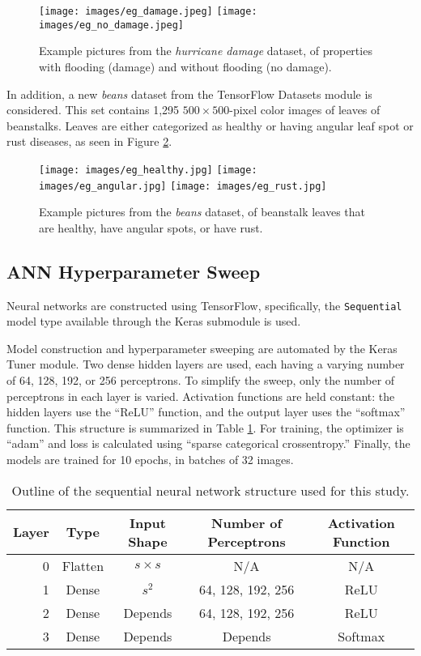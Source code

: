 \documentclass{article}
\begin{document}
\begin{figure}
	\centering
	\texttt{[image: images/eg\_damage.jpeg]}
	\texttt{[image: images/eg\_no\_damage.jpeg]}
	\caption{Example pictures from the \emph{hurricane damage} dataset, of properties with flooding (damage) and without flooding (no damage).}
	\label{fig:h-eg}
\end{figure}

In addition, a new \emph{beans} \cite{beansdata} dataset from the TensorFlow Datasets module is considered. This set contains 1,295 $500 \times 500$-pixel color images of leaves of beanstalks. Leaves are either categorized as healthy or having angular leaf spot or rust diseases, as seen in Figure \ref{fig:b-eg}.


\begin{figure}
	\centering
	\texttt{[image: images/eg\_healthy.jpg]}
	\texttt{[image: images/eg\_angular.jpg]}
	\texttt{[image: images/eg\_rust.jpg]}
	\caption{Example pictures from the \emph{beans} dataset, of beanstalk leaves that are healthy, have angular spots, or have rust.}
	\label{fig:b-eg}
\end{figure}

\subsection{ANN Hyperparameter Sweep}

Neural networks are constructed using TensorFlow, specifically, the \verb|Sequential| model type available through the Keras submodule is used.

Model construction and hyperparameter sweeping are automated by the Keras Tuner module. Two dense hidden layers are used, each having a varying number of 64, 128, 192, or 256 perceptrons. To simplify the sweep, only the number of perceptrons in each layer is varied. Activation functions are held constant: the hidden layers use the ``ReLU'' function, and the output layer uses the ``softmax'' function. This structure is summarized in Table \ref{tbl:ann}. For training, the optimizer is ``adam'' and loss is calculated using ``sparse categorical crossentropy.'' Finally, the models are trained for 10 epochs, in batches of 32 images.

\begin{table}[h!]
	\centering
	\caption{Outline of the sequential neural network structure used for this study.}
	\label{tbl:ann}
	\begin{tabular}{r|cccc}
		Layer & Type & Input Shape & Number of Perceptrons & Activation Function \\
		\hline
		0 & Flatten & $s \times s$ & N/A & N/A \\
		1 & Dense & $s^{2}$ & 64, 128, 192, 256 & ReLU \\
		2 & Dense & Depends & 64, 128, 192, 256 & ReLU \\
		3 & Dense & Depends & Depends & Softmax \\
	\end{tabular}
\end{table}
\end{document}
